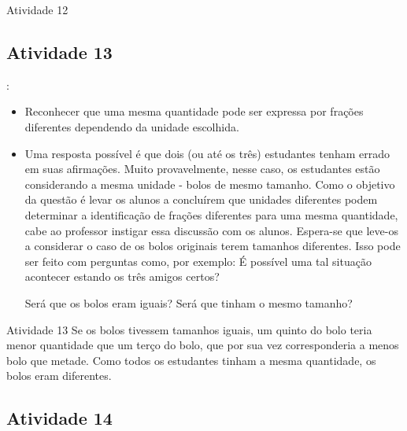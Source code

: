 \begin{multicols}{2}
\begin{resposta*}{Atividade 12}
\end{resposta*}



\subsection{Atividade 13}


   \vspace{.1cm}:

  \begin{itemize} %
    \item Reconhecer que uma mesma quantidade pode ser expressa por frações diferentes dependendo da unidade escolhida.
\end{itemize} %

  \vspace{.1cm}


  \vspace{.1cm}

  \begin{itemize} %
  \item Uma resposta possível é que dois (ou até os três) estudantes tenham errado em suas afirmações.    Muito provavelmente, nesse caso, os estudantes estão considerando a mesma unidade - bolos de mesmo tamanho. 
Como o objetivo da questão é levar os alunos a concluírem que unidades diferentes podem determinar a identificação de frações diferentes para uma mesma quantidade, cabe ao professor instigar essa discussão com os alunos. Espera-se que leve-os a considerar o caso de os bolos originais terem tamanhos diferentes. Isso pode ser feito com perguntas como, por exemplo: É possível uma tal situação acontecer estando os três amigos certos?

Será que os bolos eram iguais? Será que tinham o mesmo tamanho? 
\end{itemize}

\begin{resposta*}{Atividade 13}
 Se os bolos tivessem tamanhos iguais, um quinto do bolo teria menor quantidade que um terço do bolo, que por sua vez corresponderia a menos bolo que metade. Como todos os estudantes tinham a mesma quantidade, os bolos eram diferentes.

  \end{resposta*}



\subsection{Atividade 14}


\end{multicols}
